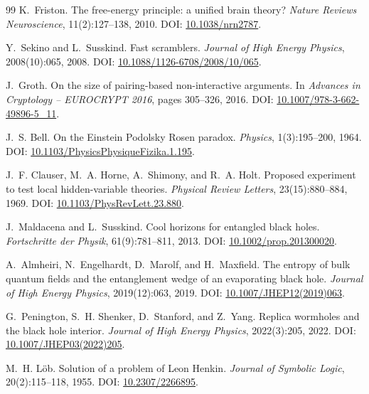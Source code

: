 \documentclass[11pt,a4paper]{article}
\theoremstyle{definition}
\theoremstyle{remark}
\begin{document}
\begin{thebibliography}{99}
K.~Friston.
\newblock The free-energy principle: a unified brain theory?
\newblock \emph{Nature Reviews Neuroscience}, 11(2):127--138, 2010.
\newblock DOI: \href{https://doi.org/10.1038/nrn2787}{10.1038/nrn2787}.

Y.~Sekino and L.~Susskind.
\newblock Fast scramblers.
\newblock \emph{Journal of High Energy Physics}, 2008(10):065, 2008.
\newblock DOI: \href{https://doi.org/10.1088/1126-6708/2008/10/065}{10.1088/1126-6708/2008/10/065}.

J.~Groth.
\newblock On the size of pairing-based non-interactive arguments.
\newblock In \emph{Advances in Cryptology -- EUROCRYPT 2016}, pages 305--326, 2016.
\newblock DOI: \href{https://doi.org/10.1007/978-3-662-49896-5_11}{10.1007/978-3-662-49896-5\_11}.

J.~S. Bell.
\newblock On the Einstein Podolsky Rosen paradox.
\newblock \emph{Physics}, 1(3):195--200, 1964.
\newblock DOI: \href{https://doi.org/10.1103/PhysicsPhysiqueFizika.1.195}{10.1103/PhysicsPhysiqueFizika.1.195}.

J.~F. Clauser, M.~A. Horne, A.~Shimony, and R.~A. Holt.
\newblock Proposed experiment to test local hidden-variable theories.
\newblock \emph{Physical Review Letters}, 23(15):880--884, 1969.
\newblock DOI: \href{https://doi.org/10.1103/PhysRevLett.23.880}{10.1103/PhysRevLett.23.880}.

J.~Maldacena and L.~Susskind.
\newblock Cool horizons for entangled black holes.
\newblock \emph{Fortschritte der Physik}, 61(9):781--811, 2013.
\newblock DOI: \href{https://doi.org/10.1002/prop.201300020}{10.1002/prop.201300020}.

A.~Almheiri, N.~Engelhardt, D.~Marolf, and H.~Maxfield.
\newblock The entropy of bulk quantum fields and the entanglement wedge of an evaporating black hole.
\newblock \emph{Journal of High Energy Physics}, 2019(12):063, 2019.
\newblock DOI: \href{https://doi.org/10.1007/JHEP12(2019)063}{10.1007/JHEP12(2019)063}.

G.~Penington, S.~H. Shenker, D.~Stanford, and Z.~Yang.
\newblock Replica wormholes and the black hole interior.
\newblock \emph{Journal of High Energy Physics}, 2022(3):205, 2022.
\newblock DOI: \href{https://doi.org/10.1007/JHEP03(2022)205}{10.1007/JHEP03(2022)205}.

M.~H. L\"ob.
\newblock Solution of a problem of Leon Henkin.
\newblock \emph{Journal of Symbolic Logic}, 20(2):115--118, 1955.
\newblock DOI: \href{https://doi.org/10.2307/2266895}{10.2307/2266895}.


\end{thebibliography}
\end{document}
